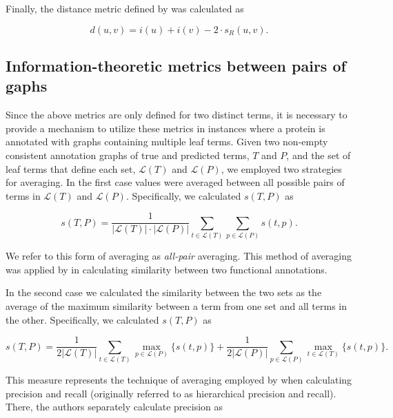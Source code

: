 \noindent Finally, the distance metric defined by \citet{Jiang1997} was calculated as

\begin{equation}
d(u,v)=i(u)+i(v)-2 \cdot s_{R}(u,v).
\end{equation}

\subsection{Information-theoretic metrics between pairs of gaphs}
\label{sec:averaging}

Since the above metrics are only defined for two distinct terms, it is necessary to provide a mechanism to utilize these metrics in instances where a protein is annotated with graphs containing multiple leaf terms. Given two non-empty consistent annotation graphs of true and predicted terms, $T$ and $P$, and the set of leaf terms that define each set, $\mathcal{L}(T)$ and $\mathcal{L}(P)$, we employed two strategies for averaging. In the first case values were averaged between all possible pairs of terms in $\mathcal{L}(T)$ and $\mathcal{L}(P)$. Specifically, we calculated $s(T,P)$ as 

\begin{equation}
s(T, P)=\frac{1}{|\mathcal{L}(T)|\cdot|\mathcal{L}(P)|}\underset{t\in\mathcal{L}(T)}{\sum}\underset{p\in\mathcal{L}(P)}{\sum}s(t,p).
\end{equation}

\noindent We refer to this form of averaging as \emph{all-pair} averaging. This method of averaging was applied by \citet{Lord2003} in calculating similarity between two functional annotations.

In the second case we calculated the similarity between the two sets as the average of the maximum similarity between a term from one set and all terms in the other.  Specifically, we calculated $s(T,P)$ as 

\begin{equation}
s(T, P)=\frac{1}{2|\mathcal{L}(T)|}\underset{t\in\mathcal{L}(T)}{\sum}\underset{p\in\mathcal{L}(P)}{\max}\{s(t,p)\}+\frac{1}{2|\mathcal{L}(P)|}\underset{p\in\mathcal{L}(P)}{\sum}\underset{t\in\mathcal{L}(T)}{\max}\{s(t, p)\}.
\label{eq:maxaverage}
\end{equation}

\noindent This measure represents the technique of averaging employed by \citet{Verspoor2006} when calculating precision and recall (originally referred to as hierarchical precision and recall). There, the authors separately calculate precision as

